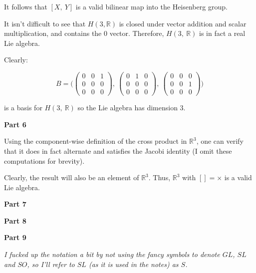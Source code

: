 \documentclass[10pt, oneside]{article}
\begin{document}
    It follows that $[X, \ Y]$ is a valid bilinear map into the Heisenberg group.
    \newline

    It isn't difficult to see that $H(3, \mathbb{R})$ is closed under vector addition and scalar multiplication, and contains the $0$ vector. Therefore, $H(3, \ \mathbb{R})$ is
    in fact a real Lie algebra.
    \newline

    Clearly:

    $$B = \Big( \begin{pmatrix} 0 & 0 & 1 \\ 0 & 0 & 0 \\ 0 & 0 & 0 \end{pmatrix}, \ \begin{pmatrix} 0 & 1 & 0 \\ 0 & 0 & 0 \\ 0 & 0 & 0 \end{pmatrix}, \ \begin{pmatrix} 0 & 0 & 0 \\ 0 & 0 & 1 \\ 0 & 0 & 0 \end{pmatrix} \Big)$$

    is a basis for $H(3, \ \mathbb{R})$ so the Lie algebra has dimension $3$.
    \newline

    \textbf{Part 6}
    \newline

    Using the component-wise definition of the cross product in $\mathbb{R}^3$, one can verify that it does in fact alternate and satisfies the Jacobi identity (I omit these computations for brevity).
    \newline

    Clearly, the
    result will also be an element of $\mathbb{R}^3$. Thus, $\mathbb{R}^3$ with $[] = \times$ is a valid Lie algebra.

    \textbf{Part 7}
    \newline



    \textbf{Part 8}
    \newline

    

    \textbf{Part 9}
    \newline

    \textit{I fucked up the notation a bit by not using the fancy symbols to denote $GL$, $SL$ and $SO$, so I'll refer to $SL$ (as it is used in the notes) as $S$.}
    \newline
\end{document}
